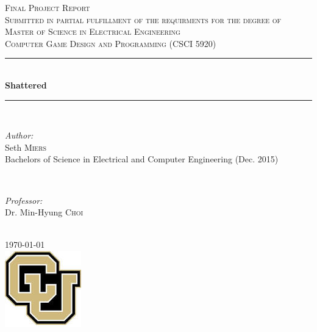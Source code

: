\documentclass[conference,compsoc]{IEEEtran}
\begin{document}
\begin{titlepage}

\author{Seth Miers}

\vspace*{\fill}                                            %

\newcommand{\HRule}{\rule{\linewidth}{0.3mm}}              %

\center                                                    %

\textsc{\LARGE Final Project Report}\\[1.5cm]                           %
\textsc{\Large Submitted in partial fulfillment of the requirments for the degree of Master of Science in Electrical Engineering}\\[0.5cm]               %
\textsc{\large Computer Game Design and Programming (CSCI 5920)}\\[0.5cm]         %

\HRule \\[0.4cm]
{ \huge \bfseries Shattered}\\[0.4cm]   %
\HRule \\[1.5cm]

\begin{minipage}{0.4\textwidth}
\begin{flushleft} \large
\emph{Author:}\\
Seth \textsc{Miers}\\
Bachelors of Science in Electrical and Computer Engineering (Dec. 2015)
\end{flushleft}
\end{minipage}
~
\begin{minipage}{0.4\textwidth}
\begin{flushright} \large
\emph{Professor:} \\
Dr. Min-Hyung \textsc{Choi}                              %
\end{flushright}
\end{minipage}\\[4cm]

{\large \today}\\[3cm]                                     %

\includegraphics[scale=0.25]{logo.jpg}\\[1cm]                             %

\vspace*{\fill}                                            %

\end{titlepage}
\end{document}
